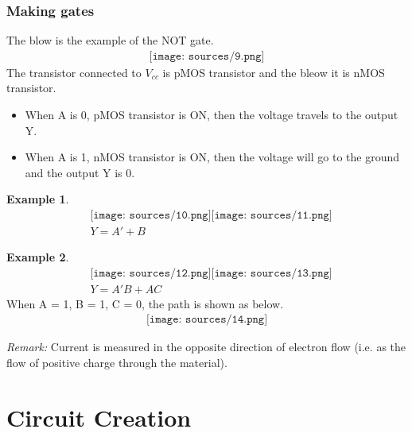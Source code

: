 \documentclass[12pt]{article}
\theoremstyle{definition}
\newtheorem{example}{Example}[section]
\begin{document}
\subsubsection{Making gates}
The blow is the example of the NOT gate.
\begin{align*}
    \texttt{[image: sources/9.png]}
\end{align*}
The transistor connected to $V_{cc}$ is pMOS transistor and the bleow it is nMOS transistor.
\begin{itemize}
    \item When A is 0, pMOS transistor is ON, then the voltage travels to the output Y.
    \item When A is 1, nMOS transistor is ON, then the voltage will go to the ground and the output Y is 0.
\end{itemize}
\begin{example}
    \begin{align*}
        &\texttt{[image: sources/10.png]}
        \texttt{[image: sources/11.png]}\\
        &Y=A'+B
    \end{align*}
\end{example}
\begin{example}
    \begin{align*}
        &\texttt{[image: sources/12.png]}
        \texttt{[image: sources/13.png]}\\
        &Y=A'B+AC \tag{multiplexer}
    \end{align*}
    When A = 1, B = 1, C = 0, the path is shown as below.\\
    \begin{align*}
        \texttt{[image: sources/14.png]}
    \end{align*}
\end{example}
\textit{Remark:} Current is measured in the opposite direction of electron flow (i.e. as the flow of positive charge through the material).
\section{Circuit Creation}
\end{document}
